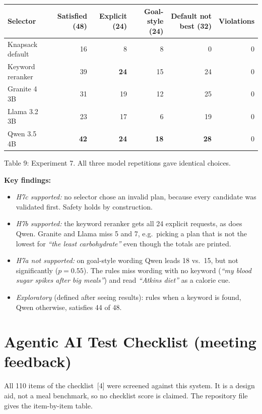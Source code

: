 \documentclass[11pt]{article}
\begin{document}
\begin{center}
\small
\begin{tabular}{@{}lrrrrr@{}}
\toprule
Selector & Satisfied (48) & Explicit (24) & Goal-style (24) & Default not best (32) & Violations \\
\midrule
Knapsack default & 16 & 8 & 8 & 0 & 0 \\
Keyword reranker & 39 & \textbf{24} & 15 & 24 & 0 \\
Granite 4 3B & 31 & 19 & 12 & 25 & 0 \\
Llama 3.2 3B & 23 & 17 & 6 & 19 & 0 \\
Qwen 3.5 4B & \textbf{42} & \textbf{24} & \textbf{18} & \textbf{28} & 0 \\
\bottomrule
\end{tabular}

Table 9: Experiment 7. All three model repetitions gave identical choices.
\end{center}

\textbf{Key findings:}
\begin{itemize}
  \item \emph{H7c supported:} no selector chose an invalid plan, because every
        candidate was validated first. Safety holds by construction.
  \item \emph{H7b supported:} the keyword reranker gets all 24 explicit
        requests, as does Qwen. Granite and Llama miss 5 and 7, e.g.\ picking
        a plan that is not the lowest for \emph{``the least carbohydrate''}
        even though the totals are printed.
  \item \emph{H7a not supported:} on goal-style wording Qwen leads 18 vs.\ 15,
        but not significantly ($p=0.55$). The rules miss wording with no
        keyword (\emph{``my blood sugar spikes after big meals''}) and read
        \emph{``Atkins diet''} as a calorie cue.
  \item \emph{Exploratory} (defined after seeing results): rules when a keyword
        is found, Qwen otherwise, satisfies 44 of 48.
\end{itemize}

\section{Agentic AI Test Checklist (meeting feedback)}

All 110 items of the checklist~[4] were screened against this system. It is a
design aid, not a meal benchmark, so no checklist score is claimed. The repository file
 gives the item-by-item table.
\end{document}
